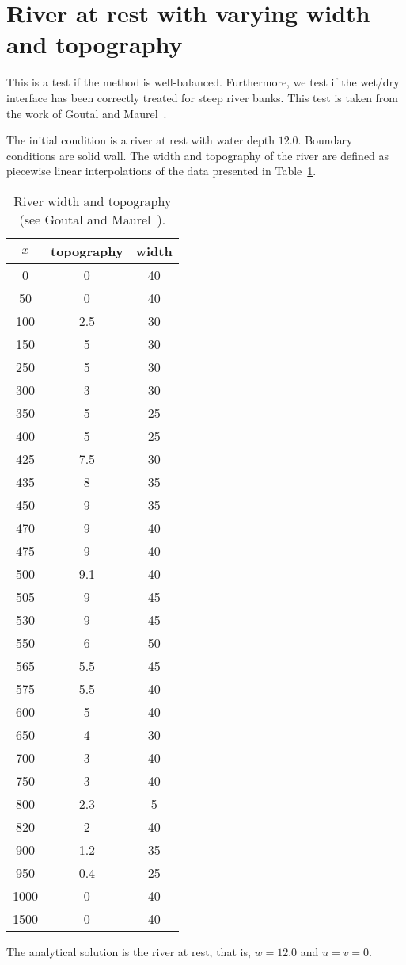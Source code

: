 


\section{River at rest with varying width and topography}

This is a test if the method is well-balanced. Furthermore, we test if the wet/dry interface has been correctly treated for steep river banks. This test is taken from the work of Goutal and Maurel~\cite{GM1997}.

The initial condition is a river at rest with water depth $12.0$. Boundary conditions are solid wall. The width and topography of the river are defined as piecewise linear interpolations of the data presented in Table~\ref{tab:width_topo}.
\begin{table}
	\centering
	\caption{River width and topography (see Goutal and Maurel~\cite{GM1997}).}
	\begin{tabular}{c|c|c}	\hline
	$x$&      topography  & width                                                       \\	\hline \hline
0 &0& 40 \\
50 &0& 40\\
100 &2.5& 30\\
150 &5& 30\\
250 &5& 30\\
300 &3& 30\\
350 &5& 25\\
400 &5& 25\\
425 &7.5& 30\\
435 &8& 35\\
450 &9& 35\\
470 &9& 40\\
475 &9& 40\\
500 &9.1& 40\\
505 &9& 45\\
530 &9& 45\\
550 &6& 50\\
565 &5.5& 45\\
575 &5.5& 40\\
600 &5& 40\\
650 &4& 30\\
700 &3& 40\\
750 &3& 40\\
800 &2.3& 5\\
820 &2& 40\\
900 &1.2& 35\\
950 &0.4& 25\\
1000 &0& 40\\
1500 &0& 40 \\ \hline
	\end{tabular}
	
	\label{tab:width_topo}
\end{table} 
The analytical solution is the river at rest, that is, $w=12.0$ and $u=v=0$.

